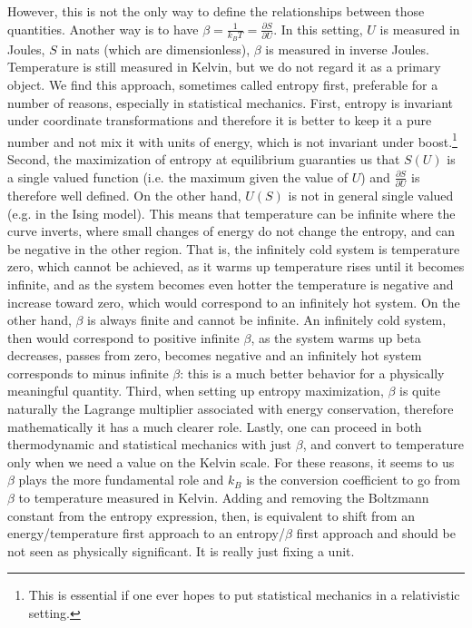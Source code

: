 \documentclass{article}
\begin{document}
However, this is not the only way to define the relationships between those quantities. Another way is to have $\beta = \frac{1}{k_B T} = \frac{\partial S}{\partial U}$. In this setting, $U$ is measured in Joules, $S$ in nats (which are dimensionless), $\beta$ is measured in inverse Joules. Temperature is still measured in Kelvin, but we do not regard it as a primary object. We find this approach, sometimes called entropy first, preferable for a number of reasons, especially in statistical mechanics. First, entropy is invariant under coordinate transformations and therefore it is better to keep it a pure number and not mix it with units of energy, which is not invariant under boost.\footnote{This is essential if one ever hopes to put statistical mechanics in a relativistic setting.} Second, the maximization of entropy at equilibrium guaranties us that $S(U)$ is a single valued function (i.e. the maximum given the value of $U$) and $\frac{\partial S}{\partial U}$ is therefore well defined. On the other hand, $U(S)$ is not in general single valued (e.g. in the Ising model). This means that temperature can be infinite where the curve inverts, where small changes of energy do not change the entropy, and can be negative in the other region. That is, the infinitely cold system is temperature zero, which cannot be achieved, as it warms up temperature rises until it becomes infinite, and as the system becomes even hotter the temperature is negative and increase toward zero, which would correspond to an infinitely hot system. On the other hand, $\beta$ is always finite and cannot be infinite. An infinitely cold system, then would correspond to positive infinite $\beta$, as the system warms up beta decreases, passes from zero, becomes negative and an infinitely hot system corresponds to minus infinite $\beta$: this is a much better behavior for a physically meaningful quantity. Third, when setting up entropy maximization, $\beta$ is quite naturally the Lagrange multiplier associated with energy conservation, therefore mathematically it has a much clearer role. Lastly, one can proceed in both thermodynamic and statistical mechanics with just $\beta$, and convert to temperature only when we need a value on the Kelvin scale. For these reasons, it seems to us $\beta$ plays the more fundamental role and $k_B$ is the conversion coefficient to go from $\beta$ to temperature measured in Kelvin. Adding and removing the Boltzmann constant from the entropy expression, then, is equivalent to shift from an energy/temperature first approach to an entropy/$\beta$ first approach and should be not seen as physically significant. It is really just fixing a unit.
\end{document}
